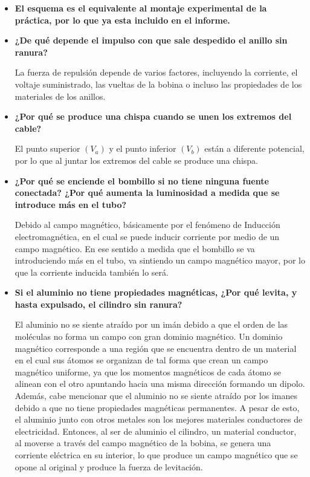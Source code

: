 \documentclass[letterpaper, 12pt]{report}
\begin{document}
\begin{itemize}
      \item \textbf{El esquema es el equivalente al montaje experimental de la
            práctica, por lo que ya esta incluido en el informe.}

      \item \textbf{¿De qué depende el impulso con que sale despedido el anillo sin ranura?}

            La fuerza de repulsión depende de varios factores,
            incluyendo la corriente, el voltaje suministrado, las
            vueltas de la bobina o incluso las propiedades de los
            materiales de los anillos.

      \item \textbf{¿Por qué se produce una chispa cuando se unen los extremos del cable?}

            El punto superior $(V_a)$ y el punto inferior $(V_b)$ están a
            diferente potencial, por lo que al juntar los extremos del
            cable se produce una chispa.

      \item \textbf{¿Por qué se enciende el bombillo si no tiene ninguna fuente conectada? ¿Por qué
            aumenta la luminosidad a medida que se introduce más en el tubo?}

            Debido al campo magnético, básicamente por el fenómeno de
            Inducción electromagnética, en el cual se puede inducir
            corriente por medio de un campo magnético. En ese sentido a
            medida que el bombillo se va introduciendo más en el tubo,
            va sintiendo un campo magnético mayor, por lo que la
            corriente inducida también lo será.

      \item \textbf{Si el aluminio no tiene propiedades magnéticas, ¿Por qué
            levita, y hasta expulsado, el cilindro sin ranura?}

            El aluminio no se siente atraído por un imán debido a que
            el orden de las moléculas no forma un campo con gran
            dominio magnético. Un dominio magnético corresponde a una
            región que se encuentra dentro de un material en el cual
            sus átomos se organizan de tal forma que crean un campo
            magnético uniforme, ya que los momentos magnéticos de cada
            átomo se alinean con el otro apuntando hacia una misma
            dirección formando un dipolo. Además, cabe mencionar que el
            aluminio no se siente atraído por los imanes debido a que
            no tiene propiedades magnéticas permanentes. A pesar de
            esto, el aluminio junto con otros metales son los mejores
            materiales conductores de electricidad. Entonces, al ser de
            aluminio el cilindro, un material conductor, al moverse a
            través del campo magnético de la bobina, se genera una
            corriente eléctrica en su interior, lo que produce un campo
            magnético que se opone al original y produce la fuerza de
            levitación.


\end{itemize}
\end{document}
